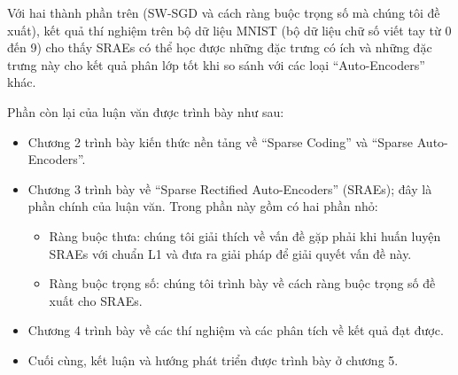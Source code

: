 Với hai thành phần trên (SW-SGD và cách ràng buộc trọng số mà chúng tôi đề xuất), kết quả thí nghiệm trên bộ dữ liệu MNIST (bộ dữ liệu chữ số viết tay từ 0 đến 9) cho thấy SRAEs có thể học được những đặc trưng có ích và những đặc trưng này cho kết quả phân lớp tốt khi so sánh với các loại ``Auto-Encoders'' khác.

Phần còn lại của luận văn được trình bày như sau:
\begin{itemize}
	\item Chương 2 trình bày kiến thức nền tảng về ``Sparse Coding'' và ``Sparse Auto-Encoders''.
	\item Chương 3 trình bày về ``Sparse Rectified Auto-Encoders'' (SRAEs); đây là phần chính của luận văn. Trong phần này gồm có hai phần nhỏ:
	\begin{itemize}
		\item Ràng buộc thưa: chúng tôi giải thích về vấn đề gặp phải khi huấn luyện SRAEs với chuẩn L1 và đưa ra giải pháp để giải quyết vấn đề này.
		\item Ràng buộc trọng số: chúng tôi trình bày về cách ràng buộc trọng số đề xuất cho SRAEs.
	\end{itemize}
	\item Chương 4 trình bày về các thí nghiệm và các phân tích về kết quả đạt được.
	\item Cuối cùng, kết luận và hướng phát triển được trình bày ở chương 5.
\end{itemize}